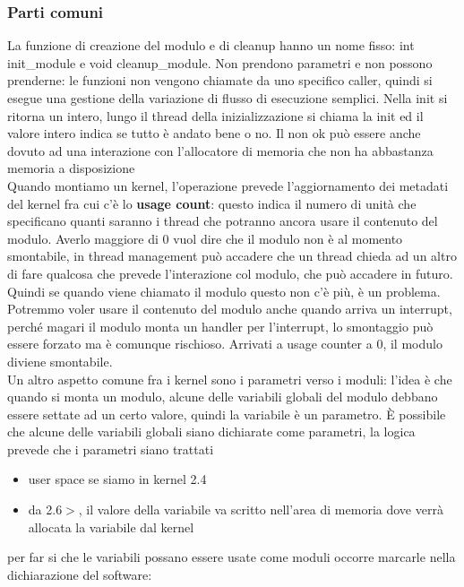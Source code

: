 \documentclass[12pt, oneside]{extbook}
\begin{document}
\subsubsection{Parti comuni}
La funzione di creazione del modulo e di cleanup hanno un nome fisso: \textsf{int init\_module} e \textsf{void cleanup\_module}. Non prendono parametri e non possono prenderne: le funzioni non vengono chiamate da uno specifico caller, quindi si esegue una gestione della variazione di flusso di esecuzione semplici. Nella init si ritorna un intero, lungo il thread della inizializzazione si chiama la init ed il valore intero indica se tutto è andato bene o no. Il non ok può essere anche dovuto ad una interazione con l'allocatore di memoria che non ha abbastanza memoria a disposizione\\Quando montiamo  un kernel, l'operazione prevede l'aggiornamento dei metadati del kernel fra cui c'è lo \textbf{usage count}: questo indica il numero di unità che specificano quanti saranno i thread che potranno ancora usare il contenuto del modulo. Averlo maggiore di 0 vuol dire che il modulo non è al momento smontabile, in thread management può accadere che un thread chieda ad un altro di fare qualcosa che prevede l'interazione col modulo, che può accadere in futuro. Quindi se quando viene chiamato il modulo questo non c'è più, è un problema.\\Potremmo voler usare il contenuto del modulo anche quando arriva un interrupt, perché magari il modulo monta un handler per l'interrupt, lo smontaggio può essere forzato ma è comunque rischioso. Arrivati a usage counter a 0, il modulo diviene smontabile.\\ Un altro aspetto comune fra i kernel sono i parametri verso i moduli: l'idea è che quando si monta un modulo, alcune delle variabili globali del modulo debbano essere settate ad un certo valore, quindi la variabile è un parametro. È possibile che alcune delle variabili globali siano dichiarate come parametri, la logica prevede che i parametri siano trattati 
\begin{itemize}
\item user space se siamo in kernel 2.4
\item da 2.6$>$, il valore della variabile va scritto nell'area di memoria dove verrà allocata la variabile dal kernel
\end{itemize}
per far si che le variabili possano essere usate come moduli occorre marcarle nella dichiarazione del software:
\end{document}

